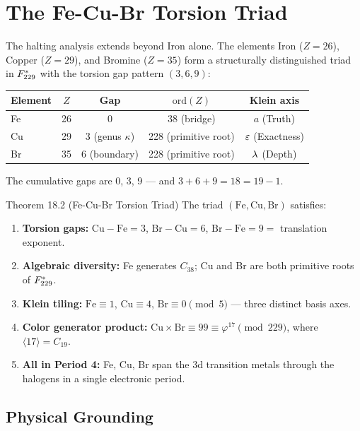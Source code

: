 \section{The Fe-Cu-Br Torsion Triad}

The halting analysis extends beyond Iron alone. The elements Iron ($Z=26$), Copper ($Z=29$), and Bromine ($Z=35$) form a structurally distinguished triad in $F_{229}^*$ with the torsion gap pattern $(3, 6, 9)$:

\begin{center}
\begin{tabular}{lcccc}
\toprule
\textbf{Element} & $Z$ & \textbf{Gap} & $\text{ord}(Z)$ & \textbf{Klein axis} \\
\midrule
Fe & 26 & 0 & 38 (bridge) & $a$ (Truth) \\
Cu & 29 & 3 (genus $\kappa$) & 228 (primitive root) & $\varepsilon$ (Exactness) \\
Br & 35 & 6 (boundary) & 228 (primitive root) & $\lambda$ (Depth) \\
\bottomrule
\end{tabular}
\end{center}

\noindent The cumulative gaps are 0, 3, 9 — and $3 + 6 + 9 = 18 = 19 - 1$.

\begin{theorembox}{Theorem 18.2 (Fe-Cu-Br Torsion Triad)}
The triad $(\text{Fe}, \text{Cu}, \text{Br})$ satisfies:
\begin{enumerate}
    \item \textbf{Torsion gaps:} $\text{Cu} - \text{Fe} = 3$, $\text{Br} - \text{Cu} = 6$, $\text{Br} - \text{Fe} = 9 = $ translation exponent.
    \item \textbf{Algebraic diversity:} Fe generates $C_{38}$; Cu and Br are both primitive roots of $F_{229}^*$.
    \item \textbf{Klein tiling:} $\text{Fe} \equiv 1$, $\text{Cu} \equiv 4$, $\text{Br} \equiv 0 \pmod{5}$ — three distinct basis axes.
    \item \textbf{Color generator product:} $\text{Cu} \times \text{Br} \equiv 99 \equiv \varphi^{17} \pmod{229}$, where $\langle 17 \rangle = C_{19}$.
    \item \textbf{All in Period 4:} Fe, Cu, Br span the 3d transition metals through the halogens in a single electronic period.
\end{enumerate}
\end{theorembox}

\subsection{Physical Grounding}

